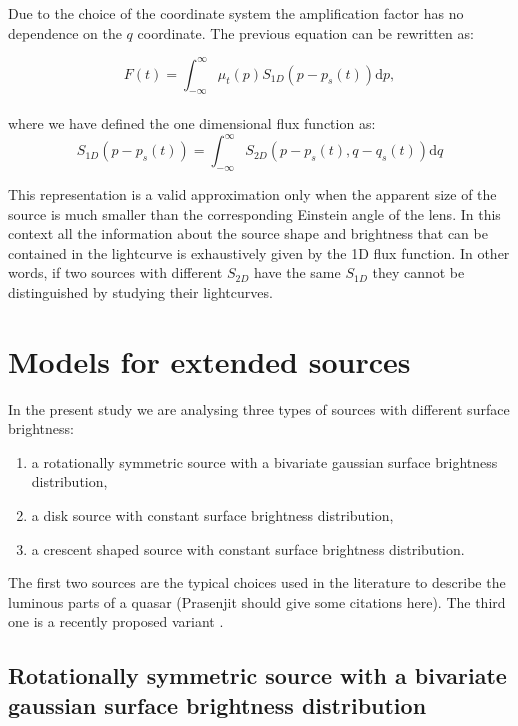 Due to the choice of the coordinate system the amplification factor has no dependence on the $q$ coordinate. The previous equation can be rewritten as:

\begin{equation}
 F(t) 
= \int_{-\infty}^\infty  \mu_t(p) S_{1D}\left(p-p_s(t)\right) \mathrm{d}p,
\label{eqn:ft}
\end{equation}
\\
where we have defined the one dimensional flux function as:
\begin{equation}
 S_{1D}(p-p_s(t)) = \int_{-\infty}^\infty S_{2D}(p-p_s(t), q-q_s(t)) \mathrm{d}q
\end{equation}

This representation is a valid approximation only when the apparent size of the source is much smaller than the corresponding Einstein angle of the lens. In this context 
all the information about the source shape and brightness that can be contained in the lightcurve is exhaustively given by the 1D flux function.
In other words, if two sources with different $S_{2D}$ have the same $S_{1D}$ they cannot be distinguished by studying their lightcurves.
 
 
\section{Models for extended sources}

In the present study we are analysing three types of sources with different surface brightness: 
\begin{enumerate}
 \renewcommand{\theenumi}{(\arabic{enumi})}
  \item a rotationally symmetric source with a bivariate gaussian surface brightness distribution,
  \item a disk source with constant surface brightness distribution,
  \item a crescent shaped source with constant surface brightness distribution.
\end{enumerate}
The first two sources are the typical choices used in the literature to describe the luminous parts of a quasar (Prasenjit should give some citations here). The third one is a recently proposed
variant \citep{2013MNRAS.434..765K}.




\subsection{Rotationally symmetric source with a bivariate gaussian surface brightness distribution}

